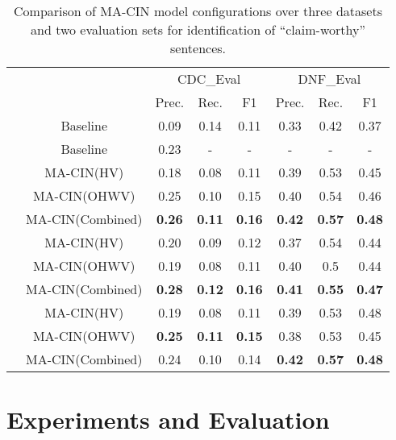 \documentclass[11pt,a4paper]{article}
\begin{document}
\begin{table*}[ht]
\begin{center}\scriptsize
\begin{tabular}{cc@{\qquad}ccc@{\qquad}ccc}
  \toprule
  \multirow{2}{*}{\raisebox{-\heavyrulewidth}{Dataset}} & \multirow{2}{*}{\raisebox{-\heavyrulewidth}{Configuration}} & \multicolumn{3}{c}{CDC\_Eval} & \multicolumn{3}{c}{DNF\_Eval} \\
  \cmidrule{3-8}
  & & Prec. & Rec. & F1 & Prec. & Rec. & F1 \\
  \midrule
   & Baseline & 0.09 & 0.14 & 0.11 & 0.33 & 0.42 & 0.37 \\
  \midrule
   & Baseline \cite{levy_context_2014} & 0.23 & - & - & - & - & - \\
   & MA-CIN(HV) & 0.18 & 0.08 & 0.11 & 0.39 & 0.53 & 0.45 \\
    & MA-CIN(OHWV) & 0.25 & 0.10 & 0.15 & 0.40 & 0.54 & 0.46 \\
    & MA-CIN(Combined) & \textbf{0.26} & \textbf{0.11} & \textbf{0.16} & \textbf{0.42} & \textbf{0.57} & \textbf{0.48} \\
  \midrule
   & MA-CIN(HV) & 0.20 & 0.09 & 0.12 & 0.37 & 0.54 & 0.44 \\
    & MA-CIN(OHWV) & 0.19 & 0.08 & 0.11 & 0.40 & 0.5 & 0.44 \\
    & MA-CIN(Combined) & \textbf{0.28} & \textbf{0.12} & \textbf{0.16} & \textbf{0.41} & \textbf{0.55} & \textbf{0.47} \\
    
  \midrule
   & MA-CIN(HV) & 0.19 & 0.08 & 0.11 & 0.39 & 0.53 & 0.48 \\
    & MA-CIN(OHWV) & \textbf{0.25} & \textbf{0.11} & \textbf{0.15} & 0.38 & 0.53 & 0.45 \\
    & MA-CIN(Combined) & 0.24 & 0.10 & 0.14 & \textbf{0.42} & \textbf{0.57} & \textbf{0.48} \\
  \bottomrule
\end{tabular}
\end{center}

\caption{\label{tab:results} Comparison of MA-CIN model configurations over three datasets and two evaluation sets for identification of ``claim-worthy'' sentences.}
\end{table*}

\section{Experiments and Evaluation}
\label{sec:exp}
\end{document}
